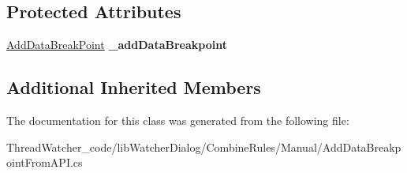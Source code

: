 \subsection*{Protected Attributes}
\begin{DoxyCompactItemize}
\item 
\hypertarget{classlib_watcher_dialog_1_1_combine_rules_1_1_add_data_breakpoint_from_a_p_i_a37c0e998087dcb56e92df0be15eefc42}{\hyperlink{class_watcher_1_1_debugger_1_1_general_rules_1_1_mode_1_1_break_point_1_1_add_data_break_point}{Add\+Data\+Break\+Point} {\bfseries \+\_\+add\+Data\+Breakpoint}}\label{classlib_watcher_dialog_1_1_combine_rules_1_1_add_data_breakpoint_from_a_p_i_a37c0e998087dcb56e92df0be15eefc42}

\end{DoxyCompactItemize}
\subsection*{Additional Inherited Members}


The documentation for this class was generated from the following file\+:\begin{DoxyCompactItemize}
\item 
Thread\+Watcher\+\_\+code/lib\+Watcher\+Dialog/\+Combine\+Rules/\+Manual/Add\+Data\+Breakpoint\+From\+A\+P\+I.\+cs\end{DoxyCompactItemize}
